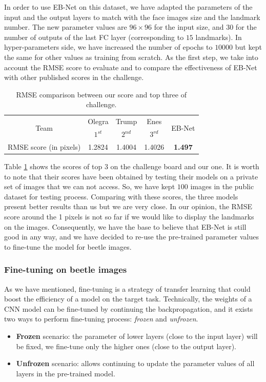 \documentclass[review]{elsarticle}
\begin{document}
In order to use EB-Net on this dataset, we have adapted the parameters of the input and the output layers to match with the face images size and the landmark number. The new parameter values are $96 \times 96$ for the input size, and $30$ for the number of outputs of the last FC layer (corresponding to $15$ landmarks). In hyper-parameters side, we have increased the number of epochs to $10000$ but kept the same for other values as training from scratch. As the first step, we take into account the RMSE score to evaluate and to compare the effectiveness of EB-Net with other published scores in the challenge.

\begin{table}[h!]
	\centering
	\begin{tabular}{ | c | c | c | c | c |}
	\hline
	\multirow{2}{*}{Team} & Olegra & Trump & Enes & \multirow{2}{*}{EB-Net} \\
	  & $1^{st}$ & $2^{nd}$ & $3^{rd}$ &  \\ \hline
	RMSE score (in pixels) & 1.2824 & 1.4004 & 1.4026 & \textbf{1.497} \\ \hline
\end{tabular}	
	\caption{RMSE comparison between our score and top three of challenge.}
	\label{tblRMSE_challenge}
\end{table}

Table \ref{tblRMSE_challenge} shows the scores of top $3$ on the challenge board and our one. It is worth to note that their scores have been obtained by testing their models on a private set of images that we can not access. So, we have kept $100$ images in the public dataset for testing process. Comparing with these scores, the three models present better results than us but we are very close. In our opinion, the RMSE score around the 1 pixels is not so far if we would like to display the landmarks on the images. Consequently, we have the base to believe that EB-Net is still good in any way, and we have decided to re-use the pre-trained parameter values to fine-tune the model for beetle images. 

\subsubsection{Fine-tuning on beetle images}
As we have mentioned, fine-tuning is a strategy of transfer learning that could boost the efficiency of a model on the target task. Technically, the weights of a CNN model can be fine-tuned by continuing the backpropagation, and it exists two ways to perform fine-tuning process: \textit{frozen} and \textit{unfrozen}.
\begin{itemize}
	\item \textbf{Frozen} scenario: the parameter of lower layers (close to the input layer) will be fixed, we fine-tune only the higher ones (close to the output layer).
	\item \textbf{Unfrozen} scenario: allows continuing to update the parameter values of all layers in the pre-trained model.
\end{itemize}
\end{document}
